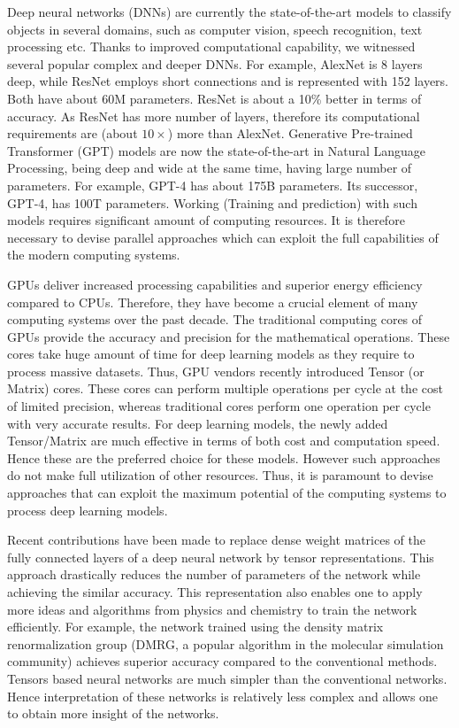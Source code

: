 Deep neural networks  (DNNs) are currently the state-of-the-art models to classify objects in several domains, such as computer vision, speech recognition, text processing etc. Thanks to improved computational capability, we witnessed several popular complex and deeper DNNs. For example, AlexNet is 8 layers deep, while ResNet employs short connections and is represented with 152 layers. Both have about 60M parameters. ResNet is about a 10\% better in terms of accuracy. As  ResNet has more number of layers, therefore its computational requirements are (about $10\times$) more than AlexNet. Generative Pre-trained Transformer (GPT) models are now the state-of-the-art in Natural Language Processing, being deep and wide at the same time, having large number of parameters. For  example, GPT-4 has about 175B parameters. Its successor, GPT-4, has 100T parameters. Working (Training and prediction) with such models requires significant amount of computing resources. It is therefore necessary to devise parallel approaches which can exploit the full capabilities of the modern computing systems.    


GPUs deliver increased processing capabilities and superior energy efficiency compared to CPUs. Therefore, they have become a crucial element of many computing systems over the past decade. The traditional computing cores of GPUs provide the accuracy and precision for the mathematical operations. These cores take huge amount of time for deep learning models as they require to process massive datasets. Thus, GPU vendors recently introduced Tensor (or Matrix) cores. These cores can perform multiple operations per cycle at the cost of limited precision, whereas traditional cores perform one operation per cycle with very accurate results. For deep learning models, the newly added Tensor/Matrix are much effective in terms of both cost and computation speed. Hence these are the preferred choice for these models. However such approaches do not make full utilization of other resources. Thus, it is paramount to devise approaches that can exploit the maximum potential of the computing systems to process deep learning models.


Recent contributions have been made to replace dense weight matrices of the fully connected layers of a deep neural network by tensor representations. This approach drastically reduces the number of parameters of the network while achieving the similar accuracy. This representation also enables one to apply more ideas and algorithms from physics and chemistry to train the network efficiently. For example, the network trained using the density matrix renormalization group (DMRG, a popular algorithm in the molecular simulation community) achieves superior accuracy compared to the conventional methods. Tensors based neural networks are much simpler than the conventional networks. Hence interpretation of these networks is relatively less complex and allows one to obtain more insight of the networks.

